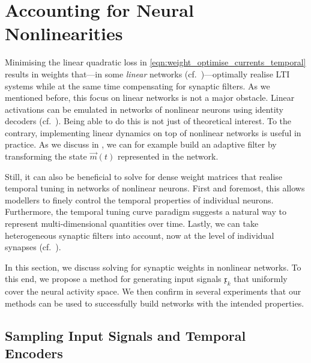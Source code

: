 
\section{Accounting for Neural Nonlinearities}
\label{sec:recurrent_weights}

Minimising the linear quadratic loss in \cref{eqn:weight_optimise_currents_temporal} results in weights that---in some \emph{linear} networks (cf.~)---optimally realise LTI systems while at the same time compensating for synaptic filters.
As we mentioned before, this focus on linear networks is not a major obstacle.
Linear activations can be emulated in networks of nonlinear neurons using \NEF identity decoders (cf.~).
Being able to do this is not just of theoretical interest. To the contrary, implementing linear dynamics on top of nonlinear networks is useful in practice.
As we discuss in , we can for example build an adaptive filter by transforming the state $\vec m(t)$ represented in the network.

Still, it can also be beneficial to solve for dense weight matrices that realise temporal tuning in networks of nonlinear neurons.
First and foremost, this allows modellers to finely control the temporal properties of individual neurons.
Furthermore, the temporal tuning curve paradigm suggests a natural way to represent multi-dimensional quantities over time.
Lastly, we can take heterogeneous synaptic filters into account, now at the level of individual synapses (cf.~).

In this section, we discuss solving for synaptic weights in nonlinear networks.
To this end, we propose a method for generating input signals $\mathfrak{x}_k$ that uniformly cover the neural activity space.
We then confirm in several experiments that our methods can be used to successfully build networks with the intended properties.

\subsection{Sampling Input Signals and Temporal Encoders}
\label{sec:solve_dynamics_nonlinear_neurons}

